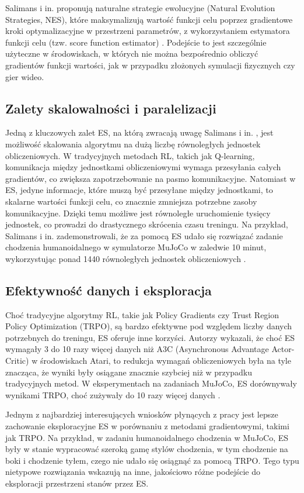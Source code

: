 Salimans i in. \cite{EV} proponują naturalne strategie ewolucyjne (Natural Evolution Strategies, NES), które maksymalizują wartość funkcji celu poprzez gradientowe kroki optymalizacyjne w przestrzeni parametrów, z wykorzystaniem estymatora funkcji celu (tzw. score function estimator) \cite{EV}. Podejście to jest szczególnie użyteczne w środowiskach, w których nie można bezpośrednio obliczyć gradientów funkcji wartości, jak w przypadku złożonych symulacji fizycznych czy gier wideo.

\subsection{Zalety skalowalności i paralelizacji}
Jedną z kluczowych zalet ES, na którą zwracają uwagę Salimans i in. \cite{EV}, jest możliwość skalowania algorytmu na dużą liczbę równoległych jednostek obliczeniowych. W tradycyjnych metodach RL, takich jak Q-learning, komunikacja między jednostkami obliczeniowymi wymaga przesyłania całych gradientów, co zwiększa zapotrzebowanie na pasmo komunikacyjne. Natomiast w ES, jedyne informacje, które muszą być przesyłane między jednostkami, to skalarne wartości funkcji celu, co znacznie zmniejsza potrzebne zasoby komunikacyjne. Dzięki temu możliwe jest równoległe uruchomienie tysięcy jednostek, co prowadzi do drastycznego skrócenia czasu treningu. Na przykład, Salimans i in. zademonstrowali, że za pomocą ES udało się rozwiązać zadanie chodzenia humanoidalnego w symulatorze MuJoCo w zaledwie 10 minut, wykorzystując ponad 1440 równoległych jednostek obliczeniowych \cite{EV}.

\subsection{Efektywność danych i eksploracja}
Choć tradycyjne algorytmy RL, takie jak Policy Gradients czy Trust Region Policy Optimization (TRPO), są bardzo efektywne pod względem liczby danych potrzebnych do treningu, ES oferuje inne korzyści. Autorzy wykazali, że choć ES wymagały 3 do 10 razy więcej danych niż A3C (Asynchronous Advantage Actor-Critic) w środowiskach Atari, to redukcja wymagań obliczeniowych była na tyle znacząca, że wyniki były osiągane znacznie szybciej niż w przypadku tradycyjnych metod. W eksperymentach na zadaniach MuJoCo, ES dorównywały wynikami TRPO, choć zużywały do 10 razy więcej danych \cite{EV}.

Jednym z najbardziej interesujących wniosków płynących z pracy jest lepsze zachowanie eksploracyjne ES w porównaniu z metodami gradientowymi, takimi jak TRPO. Na przykład, w zadaniu humanoidalnego chodzenia w MuJoCo, ES były w stanie wypracować szeroką gamę stylów chodzenia, w tym chodzenie na boki i chodzenie tyłem, czego nie udało się osiągnąć za pomocą TRPO. Tego typu nietypowe rozwiązania wskazują na inne, jakościowo różne podejście do eksploracji przestrzeni stanów przez ES.

